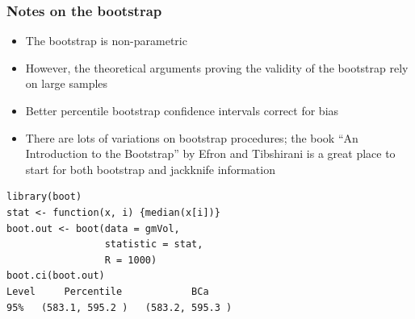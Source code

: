 \documentclass[aspectratio=169]{beamer}
\begin{document}
\begin{frame}\frametitle{Notes on the bootstrap}
\begin{itemize}
\item The bootstrap is non-parametric
\item However, the theoretical arguments proving the validity of the
  bootstrap rely on large samples
\item Better percentile bootstrap confidence intervals correct for bias
\item There are lots of variations on bootstrap procedures; the book
  ``An Introduction to the Bootstrap'' by Efron and Tibshirani is a
  great place to start for both bootstrap and jackknife information
\end{itemize}
\end{frame}

\begin{frame}[fragile]
\begin{verbatim}
library(boot)
stat <- function(x, i) {median(x[i])}  
boot.out <- boot(data = gmVol,
                 statistic = stat,
                 R = 1000)
boot.ci(boot.out)
Level     Percentile            BCa          
95%   (583.1, 595.2 )   (583.2, 595.3 )  
\end{verbatim}
\end{frame}
\end{document}
